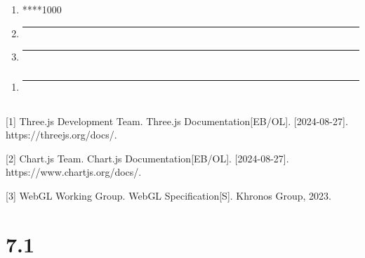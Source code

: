 \subsubsection{}\label{section-12}

\begin{enumerate}
\def\labelenumi{\arabic{enumi}.}
\item
  ****1000
\item
  \begin{center}\rule{0.5\linewidth}{0.5pt}\end{center}
\item
  \begin{center}\rule{0.5\linewidth}{0.5pt}\end{center}
\end{enumerate}

\subsubsection{}\label{section-13}

\begin{enumerate}
\def\labelenumi{\arabic{enumi}.}
\item
  \begin{center}\rule{0.5\linewidth}{0.5pt}\end{center}
\end{enumerate}

\subsection{}\label{section-14}

{[}1{]} Three.js Development Team. Three.js Documentation{[}EB/OL{]}.
{[}2024-08-27{]}. https://threejs.org/docs/.

{[}2{]} Chart.js Team. Chart.js Documentation{[}EB/OL{]}.
{[}2024-08-27{]}. https://www.chartjs.org/docs/.

{[}3{]} WebGL Working Group. WebGL Specification{[}S{]}. Khronos Group,
2023.

\section{7.1}\label{section-15}

\subsection{}\label{section-16}

